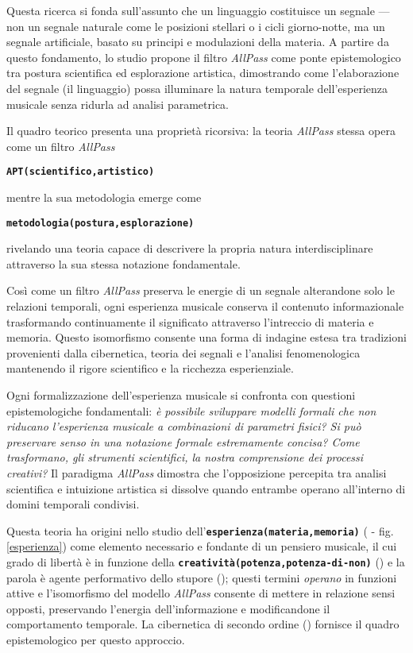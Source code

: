 \documentclass{../../lib/gs}
\newcommand{\apf}[3]{\textbf{\texttt{#1(#2,#3)}}}
\newcommand{\apfc}[3]{\begin{center}\apf{#1}{#2}{#3}\end{center}}
\begin{document}
Questa ricerca si fonda sull'assunto che un linguaggio costituisce un segnale — non un segnale naturale come le posizioni stellari o i cicli giorno-notte, ma un segnale artificiale, basato su principi e modulazioni della materia. A partire da questo fondamento, lo studio propone il filtro \emph{AllPass} come ponte epistemologico tra postura scientifica ed esplorazione artistica, dimostrando come l'elaborazione del segnale (il linguaggio) possa illuminare la natura temporale dell'esperienza musicale senza ridurla ad analisi parametrica.

Il quadro teorico presenta una proprietà ricorsiva: la teoria \emph{AllPass} stessa opera come un filtro \emph{AllPass}

\apfc{APT}{scientifico}{artistico}

\noindent mentre la sua metodologia emerge come

\apfc{metodologia}{postura}{esplorazione}

rivelando una teoria capace di descrivere la propria natura interdisciplinare attraverso la sua stessa notazione fondamentale.

Così come un filtro \emph{AllPass} preserva le energie di un segnale alterandone solo le relazioni temporali, ogni esperienza musicale conserva il contenuto informazionale trasformando continuamente il significato attraverso l'intreccio di materia e memoria. Questo isomorfismo consente una forma di indagine estesa tra tradizioni provenienti dalla cibernetica, teoria dei segnali e l'analisi fenomenologica mantenendo il rigore scientifico e la ricchezza esperienziale.

Ogni formalizzazione dell'esperienza musicale si confronta con questioni epistemologiche fondamentali: \textit{è possibile sviluppare modelli formali che non riducano l'esperienza musicale a combinazioni di parametri fisici? Si può preservare senso in una notazione formale estremamente concisa? Come trasformano, gli strumenti scientifici, la nostra comprensione dei processi creativi?} Il paradigma \emph{AllPass} dimostra che l'opposizione percepita tra analisi scientifica e intuizione artistica si dissolve quando entrambe operano all'interno di domini temporali condivisi.

Questa teoria ha origini nello studio dell'\apf{esperienza}{materia}{memoria} (\cite{bergson1896} - fig. \ref{esperienza}) come elemento necessario e fondante di un pensiero musicale, il cui grado di libertà è in funzione della \apf{creatività}{potenza}{potenza-di-non} (\cite{agamben17}) e la parola è agente performativo dello stupore (\cite{ronchi2001}); questi termini \emph{operano} in funzioni attive e l'isomorfismo del modello \emph{AllPass} consente di mettere in relazione sensi opposti, preservando l'energia dell'informazione e modificandone il comportamento temporale. La cibernetica di secondo ordine (\cite{vonfoerster1981}) fornisce il quadro epistemologico per questo approccio.
\end{document}
